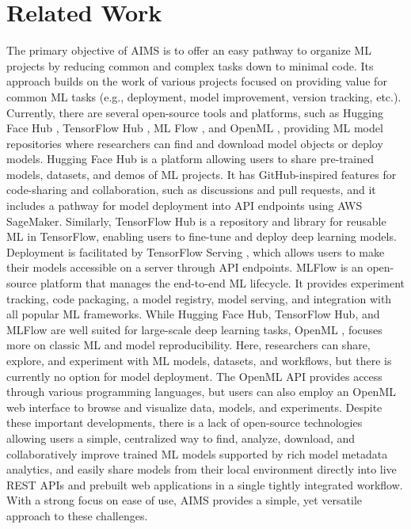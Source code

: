 \section{Related Work}
The primary objective of AIMS is to offer an easy pathway to organize ML projects by reducing common and complex tasks down to minimal code. Its approach builds on the work of various projects focused on providing value for common ML tasks (e.g., deployment, model improvement, version tracking, etc.). Currently, there are several open-source tools and platforms, such as Hugging Face Hub \citep{noauthor_hugging_2023}, TensorFlow Hub \citep{noauthor_tensorflow_2023}, ML Flow \citep{chen_developments_2020, noauthor_mlflow_2023, zaharia_accelerating_2018}, and OpenML \citep{feurer_openml-python_2021, vanschoren_openml_2014, van_rijn_openml_2013}, providing ML model repositories where researchers can find and download model objects or deploy models. Hugging Face Hub \citep{noauthor_hugging_2023} is a platform allowing users to share pre-trained models, datasets, and demos of ML projects. It has GitHub-inspired features for code-sharing and collaboration, such as discussions and pull requests, and it includes a pathway for model deployment into API endpoints using AWS SageMaker. Similarly, TensorFlow Hub \citep{noauthor_tensorflow_2023} is a repository and library for reusable ML in TensorFlow, enabling users to fine-tune and deploy deep learning models. Deployment is facilitated by TensorFlow Serving \citep{olston_tensorflow-serving_2017}, which allows users to make their models accessible on a server through API endpoints. MLFlow \citep{chen_developments_2020, noauthor_mlflow_2023, zaharia_accelerating_2018} is an open-source platform that manages the end-to-end ML lifecycle. It provides experiment tracking, code packaging, a model registry, model serving, and integration with all popular ML frameworks. While Hugging Face Hub, TensorFlow Hub, and MLFlow are well suited for large-scale deep learning tasks, OpenML \citep{feurer_openml-python_2021, vanschoren_openml_2014, van_rijn_openml_2013}, focuses more on classic ML and model reproducibility. Here, researchers can share, explore, and experiment with ML models, datasets, and workflows, but there is currently no option for model deployment. The OpenML API provides access through various programming languages, but users can also employ an OpenML web interface to browse and visualize data, models, and experiments.
Despite these important developments, there is a lack of open-source technologies allowing users a simple, centralized way to find, analyze, download, and collaboratively improve trained ML models supported by rich model metadata analytics, and easily share models from their local environment directly into live REST APIs and prebuilt web applications in a single tightly integrated workflow. With a strong focus on ease of use, AIMS provides a simple, yet versatile approach to these challenges.


